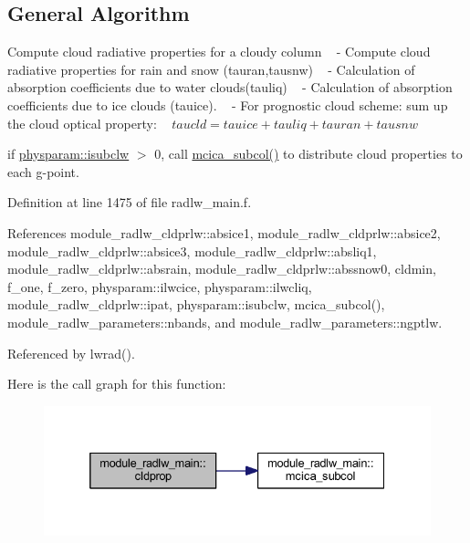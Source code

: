 \hypertarget{namespacemodule__radsw__main_general}{}\subsection{General Algorithm}\label{namespacemodule__radsw__main_general}

\begin{DoxyEnumerate}
\item Compute cloud radiative properties for a cloudy column ~\newline
 -\/ Compute cloud radiative properties for rain and snow (tauran,tausnw) ~\newline
 -\/ Calculation of absorption coefficients due to water clouds(tauliq) ~\newline
 -\/ Calculation of absorption coefficients due to ice clouds (tauice). ~\newline
 -\/ For prognostic cloud scheme\+: sum up the cloud optical property\+: ~\newline
 $ taucld=tauice+tauliq+tauran+tausnw $
\item if \hyperlink{namespacephysparam_a9555bc46102e3c368ca1f15c73b0692e}{physparam\+::isubclw} $>$ 0, call \hyperlink{namespacemodule__radlw__main_a6fd13528cd1e0335fb256c7f199e61bb}{mcica\+\_\+subcol()} to distribute cloud properties to each g-\/point. 
\end{DoxyEnumerate}

Definition at line 1475 of file radlw\+\_\+main.\+f.



References module\+\_\+radlw\+\_\+cldprlw\+::absice1, module\+\_\+radlw\+\_\+cldprlw\+::absice2, module\+\_\+radlw\+\_\+cldprlw\+::absice3, module\+\_\+radlw\+\_\+cldprlw\+::absliq1, module\+\_\+radlw\+\_\+cldprlw\+::absrain, module\+\_\+radlw\+\_\+cldprlw\+::abssnow0, cldmin, f\+\_\+one, f\+\_\+zero, physparam\+::ilwcice, physparam\+::ilwcliq, module\+\_\+radlw\+\_\+cldprlw\+::ipat, physparam\+::isubclw, mcica\+\_\+subcol(), module\+\_\+radlw\+\_\+parameters\+::nbands, and module\+\_\+radlw\+\_\+parameters\+::ngptlw.



Referenced by lwrad().



Here is the call graph for this function\+:
\nopagebreak
\begin{figure}[H]
\begin{center}
\leavevmode
\includegraphics[width=332pt]{namespacemodule__radlw__main_a8fb170c933c1644e03d8aaba2451ee0f_cgraph}
\end{center}
\end{figure}




